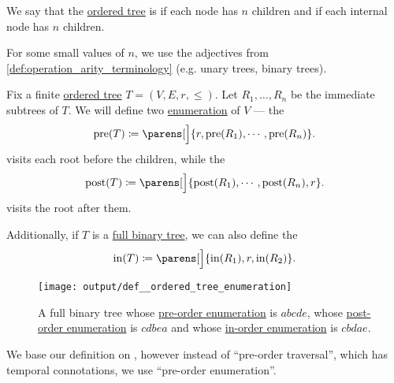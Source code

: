 \begin{definition}\label{def:n_ary_tree}
  We say that the \hyperref[def:ordered_tree]{ordered tree} is  if each node has  \( n \) children and  if each internal node has  \( n \) children.

  For some small values of \( n \), we use the adjectives from \cref{def:operation_arity_terminology} (e.g. unary trees, binary trees).
\end{definition}

\begin{definition}\label{def:ordered_tree_enumeration}\mimprovised
  Fix a finite \hyperref[def:ordered_tree]{ordered tree} \( T = (V, E, r, \leq) \). Let \( R_1, \ldots, R_n \) be the immediate subtrees of \( T \). We will define two \hyperref[def:enumeration]{enumeration} of \( V \) --- the 
  \begin{equation}\label{eq:def:ordered_tree_enumeration/pre}
    \op{pre}(T) \coloneqq \parens[\Big]{ r, \op{pre}(R_1), \cdots, \op{pre}(R_n) }.
  \end{equation}
  visits each root before the children, while the 
  \begin{equation}\label{eq:def:ordered_tree_enumeration/post}
    \op{post}(T) \coloneqq \parens[\Big]{ \op{post}(R_1), \cdots, \op{post}(R_n), r }.
  \end{equation}
  visits the root after them.

  Additionally, if \( T \) is a \hyperref[def:n_ary_tree]{full binary tree}, we can also define the 
  \begin{equation}\label{eq:def:ordered_tree_enumeration/in}
    \op{in}(T) \coloneqq \parens[\Big]{ \op{in}(R_1), r, \op{in}(R_2) }.
  \end{equation}

  \begin{figure}[!ht]
    \centering
    \texttt{[image: output/def\_\_ordered\_tree\_enumeration]}
    \caption{A full binary tree whose \hyperref[eq:def:ordered_tree_enumeration/pre]{pre-order enumeration} is \( abcde \), whose \hyperref[eq:def:ordered_tree_enumeration/post]{post-order enumeration} is \( cdbea \) and whose \hyperref[eq:def:ordered_tree_enumeration/in]{in-order enumeration} is \( cbdae \).}
    \label{fig:def:ordered_tree_enumeration}
  \end{figure}
\end{definition}
\begin{comments}
  \item We base our definition on \cite[228]{Erickson2019Algorithms}, however instead of \enquote{pre-order traversal}, which has temporal connotations, we use \enquote{pre-order enumeration}.
\end{comments}


